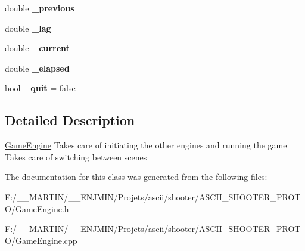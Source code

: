 \begin{DoxyCompactItemize}
double {\bfseries \+\_\+previous}
\item 
\hypertarget{class_game_engine_abe7083245b75ccd6969b54cde562167b}{}\label{class_game_engine_abe7083245b75ccd6969b54cde562167b} 
double {\bfseries \+\_\+lag}
\item 
\hypertarget{class_game_engine_a27abc89c39a79dd719084c2a9267d61d}{}\label{class_game_engine_a27abc89c39a79dd719084c2a9267d61d} 
double {\bfseries \+\_\+current}
\item 
\hypertarget{class_game_engine_a0a2ef0a08be4b7ac9f02e7db06f0bb50}{}\label{class_game_engine_a0a2ef0a08be4b7ac9f02e7db06f0bb50} 
double {\bfseries \+\_\+elapsed}
\item 
\hypertarget{class_game_engine_a6f8d9c72d09c8894b8ccbad014376285}{}\label{class_game_engine_a6f8d9c72d09c8894b8ccbad014376285} 
bool {\bfseries \+\_\+quit} = false
\end{DoxyCompactItemize}


\subsection{Detailed Description}
\hyperlink{class_game_engine}{Game\+Engine} Takes care of initiating the other engines and running the game Takes care of switching between scenes 

The documentation for this class was generated from the following files\+:\begin{DoxyCompactItemize}
\item 
F\+:/\+\_\+\+\_\+\+M\+A\+R\+T\+I\+N/\+\_\+\+\_\+\+E\+N\+J\+M\+I\+N/\+Projets/ascii/shooter/\+A\+S\+C\+I\+I\+\_\+\+S\+H\+O\+O\+T\+E\+R\+\_\+\+P\+R\+O\+T\+O/Game\+Engine.\+h\item 
F\+:/\+\_\+\+\_\+\+M\+A\+R\+T\+I\+N/\+\_\+\+\_\+\+E\+N\+J\+M\+I\+N/\+Projets/ascii/shooter/\+A\+S\+C\+I\+I\+\_\+\+S\+H\+O\+O\+T\+E\+R\+\_\+\+P\+R\+O\+T\+O/Game\+Engine.\+cpp\end{DoxyCompactItemize}
